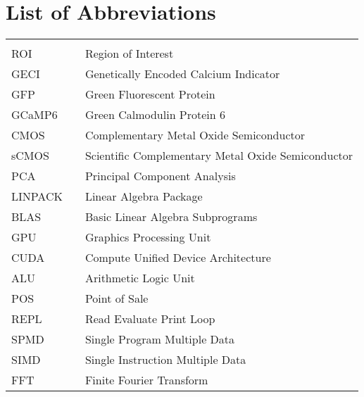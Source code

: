 \hypertarget{list-of-abbreviations}{%
\chapter*{List of Abbreviations}\label{list-of-abbreviations}}

\begin{center}
    \begin{tabular}{lll}
        \hspace*{2em}    & \hspace*{1in} & \hspace*{4.5in}                        \\
      ROI               & \dotfill      & Region of Interest  \\
      GECI               & \dotfill      & Genetically Encoded Calcium Indicator  \\
      GFP               & \dotfill      & Green Fluorescent Protein \\
      GCaMP6               & \dotfill      & Green Calmodulin Protein 6 \\
      CMOS               & \dotfill      & Complementary Metal Oxide Semiconductor  \\
      sCMOS               & \dotfill      & Scientific Complementary Metal Oxide Semiconductor \\
      PCA               & \dotfill      & Principal Component Analysis  \\
      LINPACK               & \dotfill      & Linear Algebra Package  \\
      BLAS               & \dotfill      & Basic Linear Algebra Subprograms \\
      GPU               & \dotfill      & Graphics Processing Unit  \\
      CUDA               & \dotfill      & Compute Unified Device Architecture \\
      ALU               & \dotfill      & Arithmetic Logic Unit \\
      POS               & \dotfill      & Point of Sale \\
      REPL               & \dotfill      & Read Evaluate Print Loop \\
      SPMD               & \dotfill      & Single Program Multiple Data \\
      SIMD               & \dotfill      & Single Instruction Multiple Data \\
      FFT               & \dotfill      & Finite Fourier Transform  \\

\end{tabular}
\end{center}
